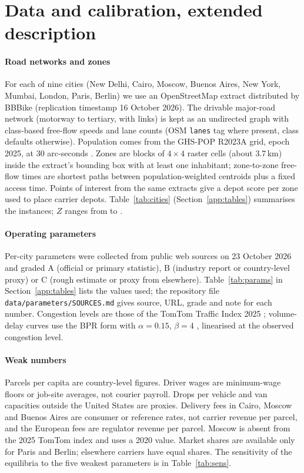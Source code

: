 \documentclass[preprint,11pt]{elsarticle}
\theoremstyle{definition}
\theoremstyle{remark}
\begin{document}

\section{Data and calibration, extended description}\label{sec:data}

\paragraph{Road networks and zones} For each of nine cities (New Delhi, Cairo, Moscow, Buenos Aires, New York, Mumbai, London, Paris, Berlin) we use an OpenStreetMap extract \citep{Haklay2008} distributed by BBBike (replication timestamp 16 October 2026). The drivable major-road network (motorway to tertiary, with links) is kept as an undirected graph with class-based free-flow speeds and lane counts (OSM \texttt{lanes} tag where present, class defaults otherwise). Population comes from the GHS-POP R2023A grid, epoch 2025, at 30 arc-seconds \citep{GHSPOP2023}. Zones are blocks of $4\times4$ raster cells (about 3.7\,km) inside the extract's bounding box with at least one inhabitant; zone-to-zone free-flow times are shortest paths between population-weighted centroids plus a fixed access time. Points of interest from the same extracts give a depot score per zone used to place carrier depots. Table~\ref{tab:cities} (Section~\ref{app:tables}) summarises the instances; $Z$ ranges from \Zmin{} to \Zmax.


\paragraph{Operating parameters} Per-city parameters were collected from public web sources on 23 October 2026 and graded A (official or primary statistic), B (industry report or country-level proxy) or C (rough estimate or proxy from elsewhere). Table~\ref{tab:params} in Section~\ref{app:tables} lists the values used; the repository file \texttt{data/parameters/SOURCES.md} gives source, URL, grade and note for each number. Congestion levels are those of the TomTom Traffic Index 2025 \citep{TomTom2025}; volume-delay curves use the BPR form with $\alpha=0.15$, $\beta=4$ \citep{BPR1964}, linearised at the observed congestion level.

\paragraph{Weak numbers} Parcels per capita are country-level figures. Driver wages are minimum-wage floors or job-site averages, not courier payroll. Drops per vehicle and van capacities outside the United States are proxies. Delivery fees in Cairo, Moscow and Buenos Aires are consumer or reference rates, not carrier revenue per parcel, and the European fees are regulator revenue per parcel. Moscow is absent from the 2025 TomTom index and uses a 2020 value. Market shares are available only for Paris and Berlin; elsewhere carriers have equal shares. The sensitivity of the equilibria to the five weakest parameters is in Table~\ref{tab:sens}.
\end{document}
